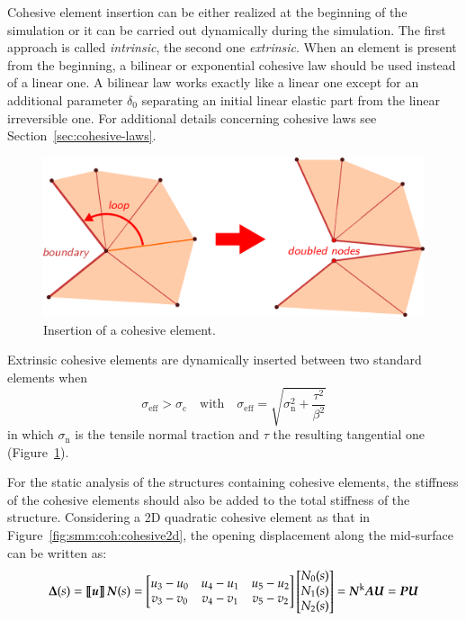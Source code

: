 Cohesive element insertion can be either realized at the beginning of
the simulation or it can be carried out dynamically during the
simulation. The first approach is called \emph{intrinsic}, the second
one \emph{extrinsic}. When an element is present from the beginning, a
bilinear or exponential cohesive law should be used instead of a
linear one. A bilinear law works exactly like a linear one except for
an additional parameter $\delta_0$ separating an initial linear
elastic part from the linear irreversible one. For additional details
concerning cohesive laws see Section~\ref{sec:cohesive-laws}.

\begin{figure}
  \centering
  \includegraphics[width=.75\textwidth]{figures/insertion}
  \caption{Insertion of a cohesive element.}
  \label{fig:smm:coh:insertion}
\end{figure}

Extrinsic cohesive elements are dynamically inserted between two
standard elements when
\begin{equation}
  \sigma_\mathrm{eff} > \sigma_\mathrm{c} \quad\text{with}\quad
  \sigma_\mathrm{eff} = \sqrt{\sigma_\mathrm{n}^2 +
    \frac{\tau^2}{\beta^2}}
\end{equation}
in which $\sigma_\mathrm{n}$ is the tensile normal traction and $\tau$
the resulting tangential one (Figure~\ref{fig:smm:coh:insertion}).

For the static analysis of the structures containing cohesive
elements, the stiffness of the cohesive elements should also be added
to the total stiffness of the structure. Considering a 2D quadratic
cohesive element as that in Figure~\ref{fig:smm:coh:cohesive2d}, the
opening displacement along the mid-surface can be written as:
\begin{equation}
  \label{eq:opening}
  \boldsymbol{\Delta}(s) = \llbracket \boldsymbol{u}\rrbracket \,\boldsymbol{N}(s) =
  \begin{bmatrix}
    u_3-u_0 & u_4-u_1 & u_5-u_2\\
    v_3-v_0 & v_4-v_1 & v_5-v_2
  \end{bmatrix}
  \begin{bmatrix}
    N_0(s) \\ N_1(s) \\ N_2(s)
  \end{bmatrix} =
  \boldsymbol{N}^\mathrm{k} \boldsymbol{A U} = \boldsymbol{PU}
\end{equation}

